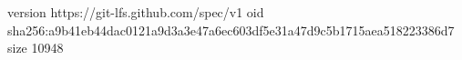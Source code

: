 version https://git-lfs.github.com/spec/v1
oid sha256:a9b41eb44dac0121a9d3a3e47a6ec603df5e31a47d9c5b1715aea518223386d7
size 10948
